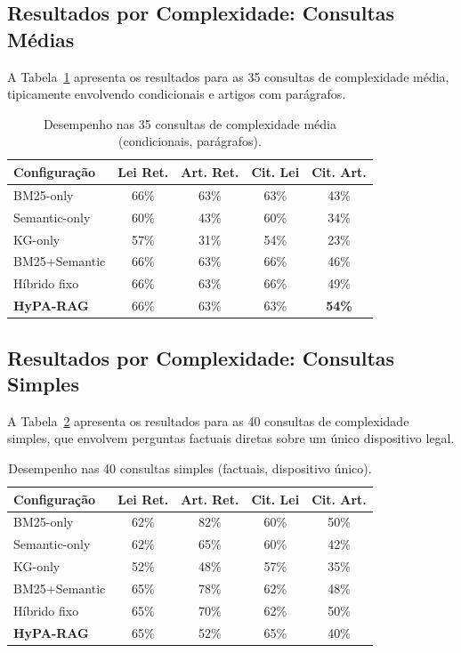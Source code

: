 \documentclass[12pt]{article}
\begin{document}
\subsection{Resultados por Complexidade: Consultas Médias}

A Tabela~\ref{tab:médias} apresenta os resultados para as 35 consultas de complexidade média, tipicamente envolvendo condicionais e artigos com parágrafos.

\begin{table}[ht]
\centering
\caption{Desempenho nas 35 consultas de complexidade média (condicionais, parágrafos).}
\label{tab:médias}
\begin{tabular}{lcccc}
\toprule
\textbf{Configuração} & \textbf{Lei Ret.} & \textbf{Art. Ret.} & \textbf{Cit. Lei} & \textbf{Cit. Art.} \\
\midrule
BM25-only & 66\% & 63\% & 63\% & 43\% \\
Semantic-only & 60\% & 43\% & 60\% & 34\% \\
KG-only & 57\% & 31\% & 54\% & 23\% \\
BM25+Semantic & 66\% & 63\% & 66\% & 46\% \\
Híbrido fixo & 66\% & 63\% & 66\% & 49\% \\
\textbf{HyPA-RAG} & 66\% & 63\% & 63\% & \textbf{54\%} \\
\bottomrule
\end{tabular}
\end{table}

\subsection{Resultados por Complexidade: Consultas Simples}

A Tabela~\ref{tab:simples} apresenta os resultados para as 40 consultas de complexidade simples, que envolvem perguntas factuais diretas sobre um único dispositivo legal.

\begin{table}[ht]
\centering
\caption{Desempenho nas 40 consultas simples (factuais, dispositivo único).}
\label{tab:simples}
\begin{tabular}{lcccc}
\toprule
\textbf{Configuração} & \textbf{Lei Ret.} & \textbf{Art. Ret.} & \textbf{Cit. Lei} & \textbf{Cit. Art.} \\
\midrule
BM25-only & 62\% & 82\% & 60\% & 50\% \\
Semantic-only & 62\% & 65\% & 60\% & 42\% \\
KG-only & 52\% & 48\% & 57\% & 35\% \\
BM25+Semantic & 65\% & 78\% & 62\% & 48\% \\
Híbrido fixo & 65\% & 70\% & 62\% & 50\% \\
\textbf{HyPA-RAG} & 65\% & 52\% & 65\% & 40\% \\
\bottomrule
\end{tabular}
\end{table}
\end{document}
